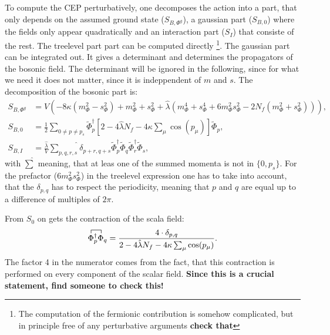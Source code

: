 To compute the CEP perturbatively, one decomposes the action into a part, that only depends on the assumed ground state ($S_{B,\Phi^g}$), 
a gaussian part ($S_{B,0}$) where the fields only appear quadratically and an interaction part ($S_I$) that consiste of the rest. The treelevel part 
part can be computed directly \footnote{The computation of the fermionic contribution is somehow complicated, but in principle 
free of any perturbative arguments \textbf{check that}}.  The gaussian part can be integrated out. It gives a determinant and determines the propagators 
of the bosonic field. The determinant will be ignored in the following, since for what we need it does not matter, since it is indeppendent of $m$ and $s$.
The decomposition of the bosonic part is:
\begin{align}
 S_{B,\Phi^g} &= V \left( -8 \kappa \left( m_{\Phi}^2 - s_{\Phi}^2 \right)  +  m_{\Phi}^2 + s_{\Phi}^2 
             + \hat\lambda \left( m_{\Phi}^4 + s_{\Phi}^4 + 6 m_{\Phi}^2s_{\Phi}^2 - 2 N_f \left(m_{\Phi}^2 + s_{\Phi}^2\right) \right) \right) ,
             \label{eq:BosonicTreelevelCEP} \\
 S_{B,0}      &= \frac{1}{2}  \sum\limits_{0\neq p \neq p_s}  \tilde\Phi_p^{\dagger}  
              \left[ 2 - 4 \hat\lambda N_f - 4 \kappa \sum_{\mu} \cos(p_{\mu}) \right]  \tilde\Phi_p ,
              \label{eq:BosonicGaussianCEP} \\
 S_{B,I}        &= \frac{\hat\lambda}{V} \widehat{\sum\limits_{p,q,r,s}}\delta_{p+r,q+s} \tilde\Phi_p^{\dagger} \tilde\Phi_q \tilde\Phi_r^{\dagger} \tilde\Phi_s,
              \label{eq:BosonicInteractionCEP}
\end{align}
with $\hat\sum$ meaning, that at leas one of the summed momenta is not in $\{0,p_s\}$. For the prefactor ($6 m_{\Phi}^2s_{\Phi}^2$) in the treelevel 
expression one has to take into account, that the $\delta_{p,q}$ has to respect the periodicity, meaning that $p$ and $q$ are equal up to a 
difference of multiples of $2\pi$.

From $S_0$ on gets the contraction of the scala field:
\begin{equation}\label{eq:ContractionOfBosonicField}
 \contraction{}{\Phi}{{}^\dagger_p}{\Phi{}}  \Phi^\dagger_p \Phi_q = \frac{4 \cdot \delta_{p,q}}{2 - 4 \hat\lambda N_f - 4 \kappa \sum_{\mu} \cos(p_{\mu}) }.
\end{equation}
The factor 4 in the numerator comes from the fact, that this contraction is performed on every component of the scalar field. \textbf{Since this is a crucial statement, find someone to check this!}

